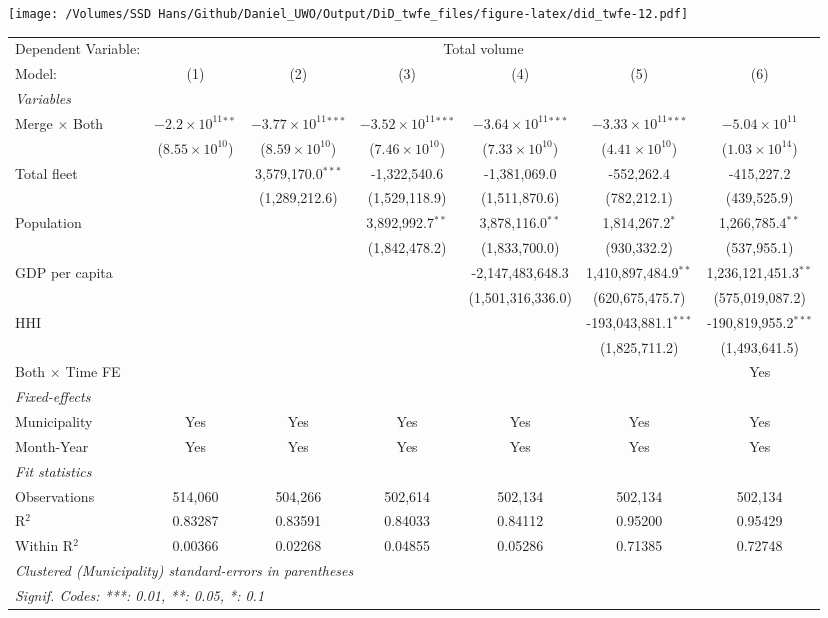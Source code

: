 \documentclass[
]{article}
\begin{document}
\texttt{[image: /Volumes/SSD Hans/Github/Daniel\_UWO/Output/DiD\_twfe\_files/figure-latex/did\_twfe-12.pdf]}

\begin{tabular}{lcccccc}
\tabularnewline\midrule\midrule
Dependent Variable:&\multicolumn{6}{c}{Total volume}\\
Model:&(1) & (2) & (3) & (4) & (5) & (6)\\
\midrule \emph{Variables}&   &   &   &   &   &  \\
Merge $\times $ Both & $-2.2\times 10^{11}$$^{**}$ & $-3.77\times 10^{11}$$^{***}$ & $-3.52\times 10^{11}$$^{***}$ & $-3.64\times 10^{11}$$^{***}$ & $-3.33\times 10^{11}$$^{***}$ & $-5.04\times 10^{11}$\\
  &($8.55\times 10^{10}$) & ($8.59\times 10^{10}$) & ($7.46\times 10^{10}$) & ($7.33\times 10^{10}$) & ($4.41\times 10^{10}$) & ($1.03\times 10^{14}$)\\
Total fleet &    & 3,579,170.0$^{***}$ & -1,322,540.6 & -1,381,069.0 & -552,262.4 & -415,227.2\\
  &   & (1,289,212.6) & (1,529,118.9) & (1,511,870.6) & (782,212.1) & (439,525.9)\\
Population &    &    & 3,892,992.7$^{**}$ & 3,878,116.0$^{**}$ & 1,814,267.2$^{*}$ & 1,266,785.4$^{**}$\\
  &   &    & (1,842,478.2) & (1,833,700.0) & (930,332.2) & (537,955.1)\\
GDP per capita &    &    &    & -2,147,483,648.3 & 1,410,897,484.9$^{**}$ & 1,236,121,451.3$^{**}$\\
  &   &    &    & (1,501,316,336.0) & (620,675,475.7) & (575,019,087.2)\\
HHI &    &    &    &    & -193,043,881.1$^{***}$ & -190,819,955.2$^{***}$\\
  &   &    &    &    & (1,825,711.2) & (1,493,641.5)\\
Both $\times$ Time FE &  &  &  &  &  & Yes\\
\midrule \emph{Fixed-effects}&   &   &   &   &   &  \\
Municipality & Yes & Yes & Yes & Yes & Yes & Yes\\
Month-Year & Yes & Yes & Yes & Yes & Yes & Yes\\
\midrule \emph{Fit statistics}&  & & & & & \\
Observations & 514,060&504,266&502,614&502,134&502,134&502,134\\
R$^2$ & 0.83287&0.83591&0.84033&0.84112&0.95200&0.95429\\
Within R$^2$ & 0.00366&0.02268&0.04855&0.05286&0.71385&0.72748\\
\midrule\midrule\multicolumn{7}{l}{\emph{Clustered (Municipality) standard-errors in parentheses}}\\
\multicolumn{7}{l}{\emph{Signif. Codes: ***: 0.01, **: 0.05, *: 0.1}}\\
\end{tabular}
\end{document}
